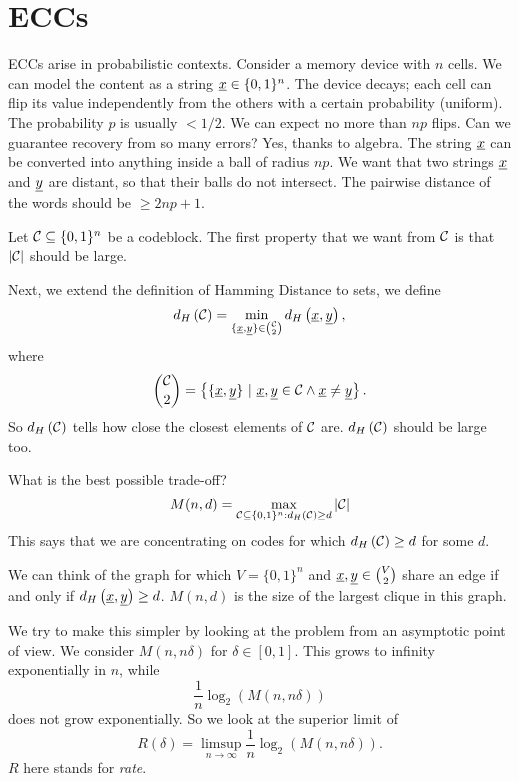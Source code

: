
\chapter{\aclp{ECC}}

\acp{ECC} arise in probabilistic contexts.
Consider a memory device with $n$ cells.
We can model the content as a string $\underline{x} \in \{0, 1\}^n$.
The device decays; each cell can flip its value independently from the others with a certain probability (uniform).
The probability $p$ is usually $< 1/2$.
We can expect no more than $np$ flips.
Can we guarantee recovery from so many errors?
Yes, thanks to algebra.
The string $\underline{x}$ can be converted into anything inside a ball of radius $np$.
We want that two strings $\underline{x}$ and $\underline{y}$ are distant, so that their balls do not intersect.
The pairwise distance of the words should be $\ge 2np + 1$.

Let $\mathcal{C} \subseteq \{0, 1\}^n$ be a codeblock.
The first property that we want from $\mathcal{C}$ is that $\left|{\mathcal{C}}\right|$ should be large.

Next, we extend the definition of Hamming Distance to sets, \ie we define
\begin{equation*}
	d_H \left({\mathcal{C}}\right) = \min_{\{\underline{x}, \underline{y}\} \in \binom{\mathcal{C}}{2}} d_H \left({\underline{x}, \underline{y}}\right),
\end{equation*}
where 
\begin{equation*}
	\binom{\C}{2} = \left\{ \{\str{x}, \str{y}\}\ |\ \str{x}, \str{y} \in \C \land \str{x} \neq \str{y} \right\}. 
\end{equation*}
So $d_H \left({\mathcal{C}}\right)$ tells how close the closest elements of $\mathcal{C}$ are.
$d_H \left({\mathcal{C}}\right)$ should be large too.

What is the best possible trade-off?
\begin{equation*}
	M(n, d) = \max_{\mathcal{C} \subseteq \{0,1\}^{n} : d_H \left({\mathcal{C}}\right) \ge d} \left|{\mathcal{C}}\right|
\end{equation*}
This says that we are concentrating on codes for which $d_H \left({\mathcal{C}}\right) \ge d$ for some $d$.

We can think of the graph for which $V = \{0, 1\}^n$ and $\underline{x}, \underline{y} \in \binom{V}{2}$ share an edge if and only if $d_H \left({\underline{x}, \underline{y}}\right) \ge d$.
$M(n,d)$ is the size of the largest clique in this graph.

We try to make this simpler by looking at the problem from an asymptotic point of view.
We consider $M(n, n \delta)$ for $\delta \in [0, 1]$.
This grows to infinity exponentially in $n$, while
\begin{equation*}
	\frac{1}{n} \log_2 \left( M(n, n \delta) \right)
\end{equation*}
does not grow exponentially.
So we look at the superior limit of
\begin{equation*}
	R(\delta) = \limsup_{n \to \infty} \frac{1}{n} \log_2 \left( M(n, n \delta) \right).
\end{equation*}
$R$ here stands for \emph{rate}.

